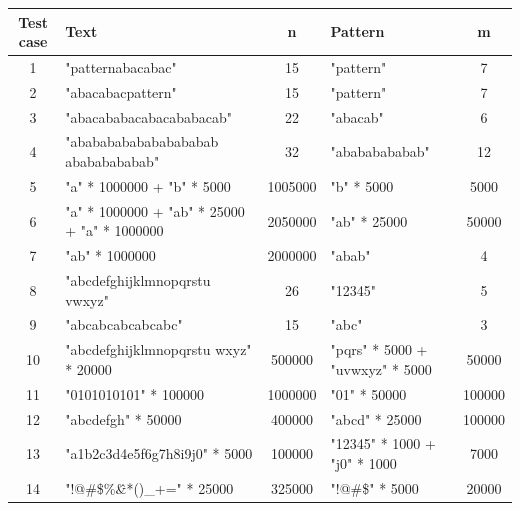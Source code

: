 \documentclass[11pt]{article}
\begin{document}
                \begin{table}[H]
                    \centering
                        \begin{tabularx}{\textwidth}{|c|X|c|X|c|}
                            \hline
                            \textbf{Test case} & \textbf{Text} & \textbf{n} & \textbf{Pattern} & \textbf{m} \\
                            \hline
                            1 & "patternabacabac" & 15 & "pattern" & 7 \\
                            \hline
                            2 & "abacabacpattern" & 15 & "pattern" & 7 \\
                            \hline
                            3 & "abacababacabacababacab" & 22 & "abacab" & 6 \\
                            \hline
                            4 & "abababababababababab abababababab" & 32 & "abababababab" & 12 \\
                            \hline
                            5 & "a" * 1000000 + "b" * 5000 & 1005000 & "b" * 5000 & 5000 \\
                            \hline
                            6 & "a" * 1000000 + "ab" * 25000 + "a" * 1000000 & 2050000 & "ab" * 25000 & 50000 \\
                            \hline
                            7 & "ab" * 1000000 & 2000000 & "abab" & 4 \\
                            \hline
                            8 & "abcdefghijklmnopqrstu vwxyz" & 26 & "12345" & 5 \\
                            \hline
                            9 & "abcabcabcabcabc" & 15 & "abc" & 3 \\
                            \hline
                            10 & "abcdefghijklmnopqrstu wxyz" * 20000 & 500000 & "pqrs" * 5000 + "uvwxyz" * 5000 & 50000 \\
                            \hline
                            11 & "0101010101" * 100000 & 1000000 & "01" * 50000 & 100000 \\
                            \hline
                            12 & "abcdefgh" * 50000 & 400000 & "abcd" * 25000 & 100000 \\
                            \hline
                            13 & "a1b2c3d4e5f6g7h8i9j0" * 5000 & 100000 & "12345" * 1000 + "j0" * 1000 & 7000 \\
                            \hline
                            14 & "!@#\$\%\^\&*()\_+=" * 25000 & 325000 & "!@#\$" * 5000 & 20000 \\ %

\end{tabularx}
\end{table}
\end{document}
